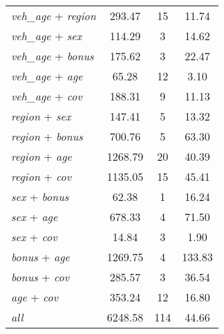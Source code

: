{\begin{ThreePartTable}
\begin{longtable}{lccc}
    \textit{veh\_age} + \textit{region} &   293.47 &       15 &    11.74 \\
    \textit{veh\_age} + \textit{sex} &   114.29 &        3 &    14.62 \\
    \textit{veh\_age} + \textit{bonus} &   175.62 &        3 &    22.47 \\
    \textit{veh\_age} + \textit{age} &    65.28 &       12 &     3.10 \\
    \textit{veh\_age} + \textit{cov} &   188.31 &        9 &    11.13 \\
    \textit{region} + \textit{sex} &   147.41 &        5 &    13.32 \\
    \textit{region} + \textit{bonus} &   700.76 &        5 &    63.30 \\
    \textit{region} + \textit{age} &  1268.79 &       20 &    40.39 \\
    \textit{region} + \textit{cov} &  1135.05 &       15 &    45.41 \\
    \textit{sex} + \textit{bonus} &    62.38 &        1 &    16.24 \\
    \textit{sex} + \textit{age} &   678.33 &        4 &    71.50 \\
    \textit{sex} + \textit{cov} &    14.84 &        3 &     1.90 \\
    \textit{bonus} + \textit{age} &  1269.75 &        4 &   133.83 \\
    \textit{bonus} + \textit{cov} &   285.57 &        3 &    36.54 \\
    \textit{age} + \textit{cov} &   353.24 &       12 &    16.80 \\
    \textit{all}\tnote{\ddag} &  6248.58 &      114 &    44.66 \\

\end{longtable}
\end{ThreePartTable}
}
